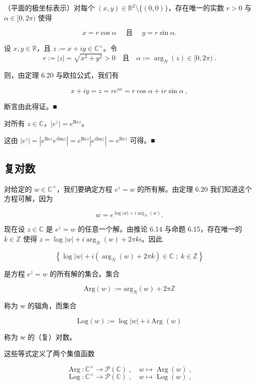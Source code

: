\begin{remark}
\begin{items}
（平面的极坐标表示）对每个 $ (x, y) \in \mathbb{R}^2 \setminus \{(0,0)\} $，存在唯一的实数 $ r > 0 $ 与 $ \alpha \in [0, 2\pi) $ 使得

\[
x=r\cos\alpha\quad\text{ 且 }\quad y=r\sin\alpha.
\]

\proofhead
设 $ x, y \in \mathbb{R} $，且 $ z := x + iy \in \mathbb{C}^\times $。令
\[
r:=|z|=\sqrt{x^{2}+y^{2}}>0\quad\text{且}\quad\alpha:=\arg_{N}(z)\in[0,2\pi)~.
\]

则，由定理 6.20 与欧拉公式，我们有

\[
x+i y=z=r e^{i\alpha}=r\cos\alpha+i r\sin\alpha~,
\]

断言由此得证。■

\item[（e）]

对所有 $ z \in \mathbb{C} $，$ |e^z| = e^{\mathrm{Re}z} $。

\proofhead
这由 $ |e^z| = |e^{\mathrm{Re}z} e^{i \mathrm{Im} z}| = e^{\mathrm{Re}z} |e^{i \mathrm{Im} z}| = e^{\mathrm{Re}z} $ 可得。■
\end{items}

\end{remark}

\subsection*{复对数}

对给定的 $ w \in \mathbb{C}^\times $，我们要确定方程 $ e^z = w $ 的所有解。由定理 6.20 我们知道这个方程可解，因为

\[
w=e^{\log|w|+i\arg_{N}(w)}.
\]

现在设 $ z \in \mathbb{C} $ 是 $ e^z = w $ 的任意一个解。由推论 6.14 与命题 6.15，存在唯一的 $ k \in \mathbb{Z} $ 使得 $ z = \log |w| + i \arg_N(w) + 2\pi ki $。因此

\[
\left\{\log|w|+i\left(\arg_{N}(w)+2\pi k\right)\in\mathbb{C}\;;\;k\in\mathbb{Z}\right\}
\]

是方程 $ e^{z} = w $ 的所有解的集合。集合

\[
\mathrm{A r g}(w):=\mathrm{a r g}_{N}(w)+2\pi\mathbb{Z}
\]

称为 w 的辐角，而集合

\[
\mathrm{Log}(w):=\log|w|+i\operatorname{Arg}(w)
\]

称为 w 的（复）对数。

这些等式定义了两个集值函数

\[
\operatorname{A r g}\colon\mathbb{C}^{\times}\to\mathcal{P}(\mathbb{C})\;,\quad w\mapsto\operatorname{A r g}(w)\;,
\]
\[
\operatorname{L o g}\colon\mathbb{C}^{\times}\to\mathcal{P}(\mathbb{C})\;,\quad w\mapsto\operatorname{L o g}(w)\;,
\]

